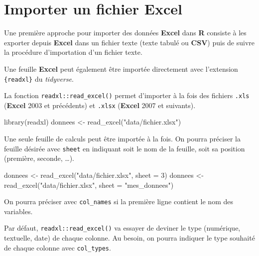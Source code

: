 \documentclass[
  letterpaper,
  DIV=11,
  numbers=noendperiod,
  oneside]{scrreprt}
\newenvironment{Shaded}{\begin{snugshade}}{\end{snugshade}}
\newcommand{\AttributeTok}[1]{\textcolor[rgb]{0.40,0.45,0.13}{#1}}
\newcommand{\DecValTok}[1]{\textcolor[rgb]{0.68,0.00,0.00}{#1}}
\newcommand{\FunctionTok}[1]{\textcolor[rgb]{0.28,0.35,0.67}{#1}}
\newcommand{\NormalTok}[1]{\textcolor[rgb]{0.00,0.23,0.31}{#1}}
\newcommand{\OtherTok}[1]{\textcolor[rgb]{0.00,0.23,0.31}{#1}}
\newcommand{\StringTok}[1]{\textcolor[rgb]{0.13,0.47,0.30}{#1}}
\begin{document}
\hypertarget{importer-un-fichier-excel}{%
\section{Importer un fichier Excel}\label{importer-un-fichier-excel}}

Une première approche pour importer des données \textbf{Excel} dans
\textbf{R} consiste à les exporter depuis \textbf{Excel} dans un fichier
texte (texte tabulé ou \textbf{CSV}) puis de suivre la procédure
d'importation d'un fichier texte.

Une feuille \textbf{Excel} peut également être importée directement avec
l'extension \texttt{\{readxl\}} du \emph{tidyverse}.

La fonction \texttt{readxl::read\_excel()} permet d'importer à la fois
des fichiers \texttt{.xls} (\textbf{Excel} 2003 et précédents) et
\texttt{.xlsx} (\textbf{Excel} 2007 et suivants).

\begin{Shaded}
\begin{Highlighting}[]
\FunctionTok{library}\NormalTok{(readxl)}
\NormalTok{donnees }\OtherTok{\textless{}{-}} \FunctionTok{read\_excel}\NormalTok{(}\StringTok{"data/fichier.xlsx"}\NormalTok{)}
\end{Highlighting}
\end{Shaded}

Une seule feuille de calculs peut être importée à la fois. On pourra
préciser la feuille désirée avec \texttt{sheet} en indiquant soit le nom
de la feuille, soit sa position (première, seconde, \ldots).

\begin{Shaded}
\begin{Highlighting}[]
\NormalTok{donnees }\OtherTok{\textless{}{-}} \FunctionTok{read\_excel}\NormalTok{(}\StringTok{"data/fichier.xlsx"}\NormalTok{, }\AttributeTok{sheet =} \DecValTok{3}\NormalTok{)}
\NormalTok{donnees }\OtherTok{\textless{}{-}} \FunctionTok{read\_excel}\NormalTok{(}\StringTok{"data/fichier.xlsx"}\NormalTok{, }\AttributeTok{sheet =} \StringTok{"mes\_donnees"}\NormalTok{)}
\end{Highlighting}
\end{Shaded}

On pourra préciser avec \texttt{col\_names} si la première ligne
contient le nom des variables.

Par défaut, \texttt{readxl::read\_excel()} va essayer de deviner le type
(numérique, textuelle, date) de chaque colonne. Au besoin, on pourra
indiquer le type souhaité de chaque colonne avec \texttt{col\_types}.
\end{document}
